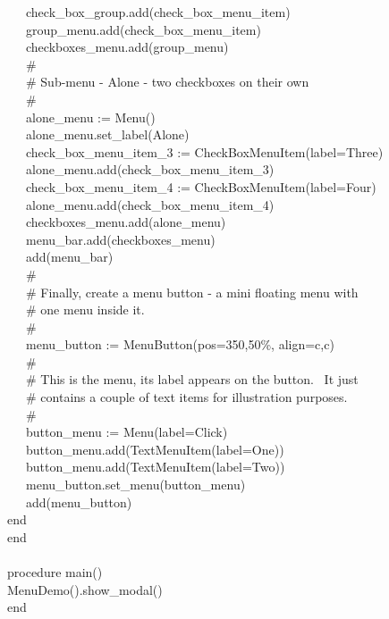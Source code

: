 {\>   \ \ \ check\_box\_group.add(check\_box\_menu\_item) \\
\>   \ \ \ group\_menu.add(check\_box\_menu\_item) \\
\>   \ \ \ checkboxes\_menu.add(group\_menu) \\
\>   \ \ \ \# \\
\>   \ \ \ \# Sub-menu - {\textquotedbl}Alone{\textquotedbl} - two
checkboxes on their own \\
\>   \ \ \ \# \\
\>   \ \ \ alone\_menu := Menu() \\
\>   \ \ \ alone\_menu.set\_label({\textquotedbl}Alone{\textquotedbl}) \\
\>   \ \ \ check\_box\_menu\_item\_3 :=
CheckBoxMenuItem({\textquotedbl}label=Three{\textquotedbl}) \\
\>   \ \ \ alone\_menu.add(check\_box\_menu\_item\_3) \\
\>   \ \ \ check\_box\_menu\_item\_4 :=
CheckBoxMenuItem({\textquotedbl}label=Four{\textquotedbl}) \\
\>   \ \ \ alone\_menu.add(check\_box\_menu\_item\_4) \\
\>   \ \ \ checkboxes\_menu.add(alone\_menu) \\
\>   \ \ \ menu\_bar.add(checkboxes\_menu) \\
\>   \ \ \ add(menu\_bar) \\
\>   \ \ \ \# \\
\>   \ \ \ \# Finally, create a menu button - a mini floating menu with \\
\>   \ \ \ \# one menu inside it. \\
\>   \ \ \ \# \\
\>   \ \ \ menu\_button :=
MenuButton({\textquotedbl}pos=350,50\%{\textquotedbl},
{\textquotedbl}align=c,c{\textquotedbl}) \\
\>   \ \ \ \# \\
\>   \ \ \ \# This is the menu, its label appears on the button. \ It just\\
\>   \ \ \ \# contains a couple of text items for illustration purposes. \\
\>   \ \ \ \# \\
\>   \ \ \ button\_menu :=
Menu({\textquotedbl}label=Click{\textquotedbl}) \\
\>   \ \ \ button\_menu.add(TextMenuItem({\textquotedbl}label=One{\textquotedbl})) \\
\>   \ \ \ button\_menu.add(TextMenuItem({\textquotedbl}label=Two{\textquotedbl})) \\
\>   \ \ \ menu\_button.set\_menu(button\_menu) \\
\>   \ \ \ add(menu\_button) \\
\>   end \\
end \\
\ \\
procedure main() \\
\>   MenuDemo().show\_modal() \\
end
}

